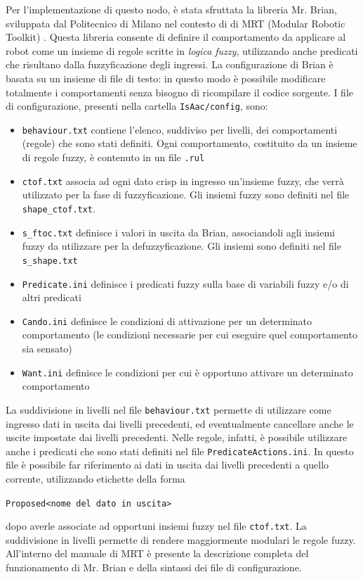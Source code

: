 Per l'implementazione di questo nodo, è stata sfruttata la libreria Mr. Brian, sviluppata dal Politecnico di Milano nel contesto di di MRT (Modular Robotic Toolkit) \cite{mrt}. Questa libreria consente di definire il comportamento da applicare al robot come un insieme di regole scritte in \emph{logica fuzzy}, utilizzando anche predicati che risultano dalla fuzzyficazione degli ingressi. La configurazione di Brian è basata su un insieme di file di testo: in questo modo è possibile modificare totalmente i comportamenti senza bisogno di ricompilare il codice sorgente. I file di configurazione, presenti nella cartella \verb|IsAac/config|, sono:
\begin{itemize}
\item \verb|behaviour.txt| contiene l'elenco, suddiviso per livelli, dei comportamenti (regole) che sono stati definiti. Ogni comportamento, costituito da un insieme di regole fuzzy, è contenuto in un file \verb|.rul|
\item \verb|ctof.txt| associa ad ogni dato crisp in ingresso un'insieme fuzzy, che verrà utilizzato per la fase di fuzzyficazione. Gli insiemi fuzzy sono definiti nel file \verb|shape_ctof.txt|.
\item \verb|s_ftoc.txt| definisce i valori in uscita da Brian, associandoli agli insiemi fuzzy da utilizzare per la defuzzyficazione. Gli insiemi sono definiti nel file \verb|s_shape.txt|
\item \verb|Predicate.ini| definisce i predicati fuzzy sulla base di variabili fuzzy e/o di altri predicati
\item \verb|Cando.ini| definisce le condizioni di attivazione per un determinato comportamento (le condizioni necessarie per cui eseguire quel comportamento sia sensato)
\item \verb|Want.ini| definisce le condizioni per cui è opportuno attivare un determinato comportamento
\end{itemize}
La suddivisione in livelli nel file \verb|behaviour.txt| permette di utilizzare come ingresso dati in uscita dai livelli precedenti, ed eventualmente cancellare anche le uscite impostate dai livelli precedenti. Nelle regole, infatti, è possibile utilizzare anche i predicati che sono stati definiti nel file \verb|PredicateActions.ini|. In questo file è possibile far riferimento ai dati in uscita dai livelli precedenti a quello corrente, utilizzando etichette della forma
\begin{center}\verb|Proposed<nome del dato in uscita>|\end{center}
dopo averle associate ad opportuni insiemi fuzzy nel file \verb|ctof.txt|. La suddivisione in livelli permette di rendere maggiormente modulari le regole fuzzy. All'interno del manuale di MRT \cite{mrtmanual} è presente la descrizione completa del funzionamento di Mr. Brian e della sintassi dei file di configurazione.

